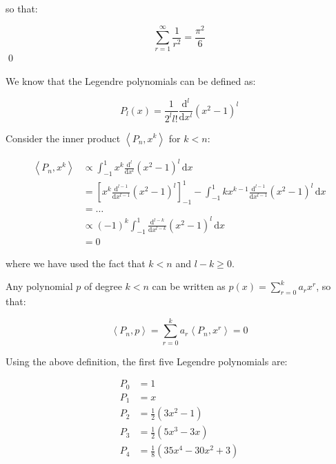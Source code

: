 \documentclass[12pt]{article}
\begin{document}
so that:

\begin{equation}
    \sum_{r = 1}^{\infty} \frac{1}{r^{2}} = \frac{\pi^{2}}{6}
\end{equation}
\qed



We know that the Legendre polynomials can be defined as:

\begin{equation}
    P_{l}(x) = \frac{1}{2^{l} l!} \frac{\mathrm{d}^{l}}{\mathrm{d}x^{l}} (x^{2} - 1)^{l}
\end{equation}

Consider the inner product $\left\langle P_{n}, x^{k} \right\rangle$ for $k < n$:

\begin{equation}
\begin{split}
    \left\langle P_{n}, x^{k} \right\rangle &\propto \int_{-1}^{1} x^{k} \frac{\mathrm{d}^{l}}{\mathrm{d}x^{l}} (x^{2} - 1)^{l} \, \mathrm{d}x \\
    &= \left[ x^{k} \frac{\mathrm{d}^{l - 1}}{\mathrm{d}x^{l - 1}} (x^{2} - 1)^{l} \right]_{-1}^{1} - \int_{-1}^{1} k x^{k - 1} \frac{\mathrm{d}^{l - 1}}{\mathrm{d}x^{l - 1}} (x^{2} - 1)^{l} \, \mathrm{d}x \\
    &= \dots \\
    &\propto (-1)^{k} \int_{-1}^{1} \frac{\mathrm{d}^{l - k}}{\mathrm{d}x^{l - k}} (x^{2} - 1)^{l} \, \mathrm{d}x \\
    &= 0
\end{split}
\end{equation}

where we have used the fact that $k < n$ and $l - k \ge 0$.

Any polynomial $p$ of degree $k < n$ can be written as $p(x) = \sum_{r = 0}^{k} a_{r} x^{r}$, so that:

\begin{equation}
    \left\langle P_{n}, p \right\rangle = \sum_{r = 0}^{k} a_{r} \left\langle P_{n}, x^{r} \right\rangle = 0
\end{equation}

Using the above definition, the first five Legendre polynomials are:

\begin{equation}
\begin{split}
    P_{0} &= 1 \\
    P_{1} &= x \\
    P_{2} &= \frac{1}{2} (3x^{2} - 1) \\
    P_{3} &= \frac{1}{2} (5x^{3} - 3x) \\
    P_{4} &= \frac{1}{8} (35x^{4} - 30x^{2} + 3)
\end{split}
\end{equation}
\end{document}
